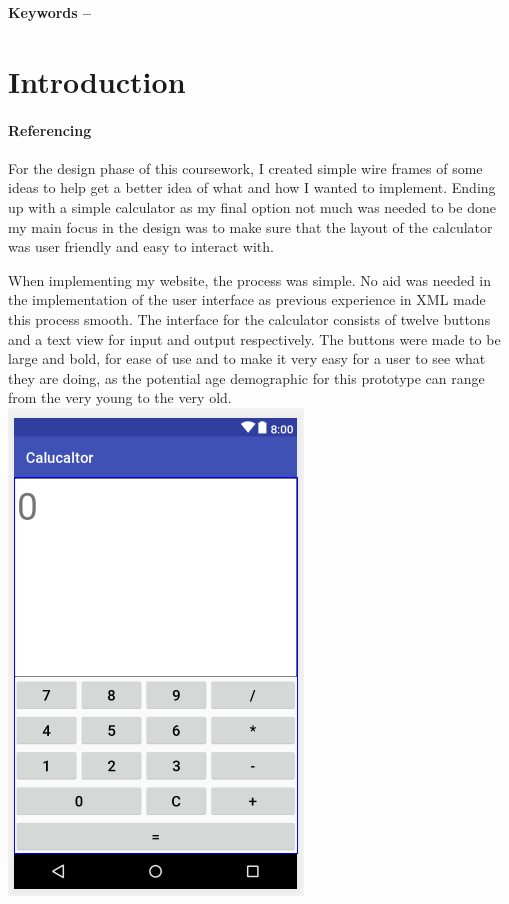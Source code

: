 \documentclass[10pt, a4paper]{article}
\title{\mytitle}
\author{\myauthor\hspace{1em}\\\contact\\Edinburgh Napier University\hspace{0.5em}-\hspace{0.5em}\mymodule}
\date{}
\begin{document}
    \maketitle
    \begin{abstract}
        The following report outlines the process and details towards the creation of the calculator application
		for the Mobile application development.		
    \end{abstract}
    
    \textbf{Keywords -- }{\mykeywords}
    
    \section{Introduction}
	
	
    \paragraph{Referencing}
	\cite{https://www.androidauthority.com/build-a-calculator-app-721910/}
	\cite{www.w3schools.com}
	
	For the design phase of this coursework, I created simple wire frames of some ideas to help get a better idea
	of what and how I wanted to implement.
	Ending up with a simple calculator as my final option not much was needed to be done my main focus in the design
	was to make sure that the layout of the calculator was user friendly and easy to interact with.
	
	When implementing my website, the process was simple. 
	No aid was needed in the implementation of the user interface as previous experience in XML made this process smooth.
	The interface for the calculator consists of twelve buttons and a text view for input and output respectively.
	The buttons were made to be large and bold, for ease of use and to make it very easy for a user to see what they are doing, as the potential age demographic
	for this prototype can range from the very young to the very old.
	\includegraphics{calc.png}
	
\end{document}
